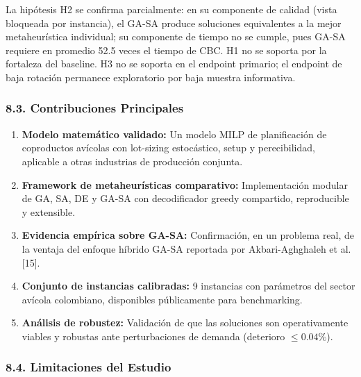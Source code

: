 \documentclass[
  spanish,
  12pt,
]{article}
\providecommand{\tightlist}{%
  \setlength{\itemsep}{0pt}\setlength{\parskip}{0pt}}
\begin{document}
La hipótesis H2 se confirma parcialmente: en su componente de calidad
(vista bloqueada por instancia), el GA-SA produce soluciones
equivalentes a la mejor metaheurística individual; su componente de
tiempo no se cumple, pues GA-SA requiere en promedio 52.5 veces el
tiempo de CBC. H1 no se soporta por la fortaleza del baseline. H3 no se
soporta en el endpoint primario; el endpoint de baja rotación permanece
exploratorio por baja muestra informativa.

\subsubsection{8.3. Contribuciones
Principales}\label{contribuciones-principales}

\begin{enumerate}
\def\labelenumi{\arabic{enumi}.}
\tightlist
\item
  \textbf{Modelo matemático validado:} Un modelo MILP de planificación
  de coproductos avícolas con lot-sizing estocástico, setup y
  perecibilidad, aplicable a otras industrias de producción conjunta.
\item
  \textbf{Framework de metaheurísticas comparativo:} Implementación
  modular de GA, SA, DE y GA-SA con decodificador greedy compartido,
  reproducible y extensible.
\item
  \textbf{Evidencia empírica sobre GA-SA:} Confirmación, en un problema
  real, de la ventaja del enfoque híbrido GA-SA reportada por
  Akbari-Aghghaleh et al. {[}15{]}.
\item
  \textbf{Conjunto de instancias calibradas:} 9 instancias con
  parámetros del sector avícola colombiano, disponibles públicamente
  para benchmarking.
\item
  \textbf{Análisis de robustez:} Validación de que las soluciones son
  operativamente viables y robustas ante perturbaciones de demanda
  (deterioro \(\leq 0.04\%\)).
\end{enumerate}

\subsubsection{8.4. Limitaciones del
Estudio}\label{limitaciones-del-estudio}
\end{document}
